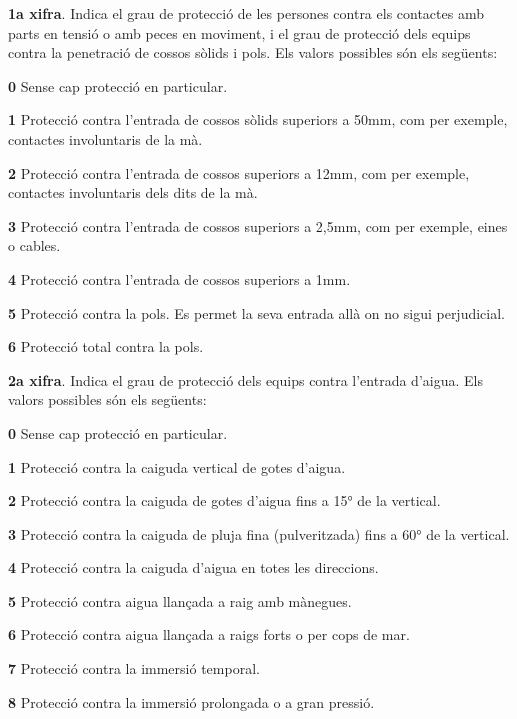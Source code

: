 \textbf{1a xifra}. Indica el grau de protecci\'{o} de les persones contra els contactes amb
parts en tensi\'{o} o amb peces en moviment, i el grau de protecci\'{o} dels equips contra la
penetraci\'{o} de cossos s\`{o}lids i pols. Els valors possibles s\'{o}n els seg\"{u}ents:
\begin{list}{}
   {\setlength{\labelwidth}{10mm} \setlength{\leftmargin}{10mm} \setlength{\labelsep}{2mm}}
   \item[\textbf{0}] Sense cap protecci\'{o} en particular.
   \item[\textbf{1}] Protecci\'{o} contra l'entrada de cossos s\`{o}lids superiors a 50\unit{mm},
   com per exemple,   contactes involuntaris de la m\`{a}.
   \item[\textbf{2}] Protecci\'{o} contra l'entrada de cossos superiors a 12\unit{mm}, com per exemple,
   contactes involuntaris dels dits de la m\`{a}.
   \item[\textbf{3}] Protecci\'{o} contra l'entrada de cossos superiors a 2,5\unit{mm},
   com per exemple, eines o cables.
   \item[\textbf{4}] Protecci\'{o} contra l'entrada de cossos superiors a 1\unit{mm}.
   \item[\textbf{5}] Protecci\'{o} contra la pols. Es permet la seva entrada all\`{a} on no sigui perjudicial.
   \item[\textbf{6}] Protecci\'{o} total contra la pols.
\end{list}

\textbf{2a xifra}. Indica el grau de protecci\'{o} dels equips contra
l'entrada d'aigua. Els valors possibles s\'{o}n els seg\"{u}ents:
\begin{list}{}
   {\setlength{\labelwidth}{10mm} \setlength{\leftmargin}{10mm} \setlength{\labelsep}{2mm}}
   \item[\textbf{0}] Sense cap protecci\'{o} en particular.
   \item[\textbf{1}] Protecci\'{o} contra la caiguda vertical de gotes d'aigua.
   \item[\textbf{2}] Protecci\'{o} contra la caiguda de gotes d'aigua fins a \ang{15} de la  vertical.
   \item[\textbf{3}] Protecci\'{o} contra la caiguda de pluja fina (pulveritzada) fins a \ang{60} de la  vertical.
   \item[\textbf{4}] Protecci\'{o} contra la caiguda d'aigua en totes les direccions.
   \item[\textbf{5}] Protecci\'{o} contra aigua llan\c{c}ada a raig amb m\`{a}negues.
   \item[\textbf{6}] Protecci\'{o} contra aigua llan\c{c}ada a raigs forts o per cops de mar.
   \item[\textbf{7}] Protecci\'{o} contra la immersi\'{o} temporal.
   \item[\textbf{8}] Protecci\'{o} contra la immersi\'{o} prolongada o a gran pressi\'{o}.
\end{list}



